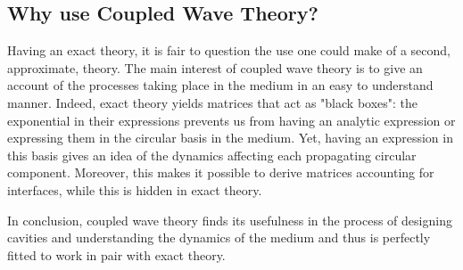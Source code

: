 \subsection{Why use Coupled Wave Theory?}
Having an exact theory, it is fair to question the use one could make of a second, approximate, theory. The main interest of coupled wave theory is to give an account of the processes taking place in the medium in an easy to understand manner. Indeed, exact theory yields matrices that act as "black boxes": the exponential in their expressions prevents us from having an analytic expression or expressing them in the circular basis in the medium. Yet, having an expression in this basis gives an idea of the dynamics affecting each propagating circular component. Moreover, this makes it possible to derive matrices accounting for interfaces, while this is hidden in exact theory.

In conclusion, coupled wave theory finds its usefulness in the process of designing cavities and understanding the dynamics of the medium and thus is perfectly fitted to work in pair with exact theory.